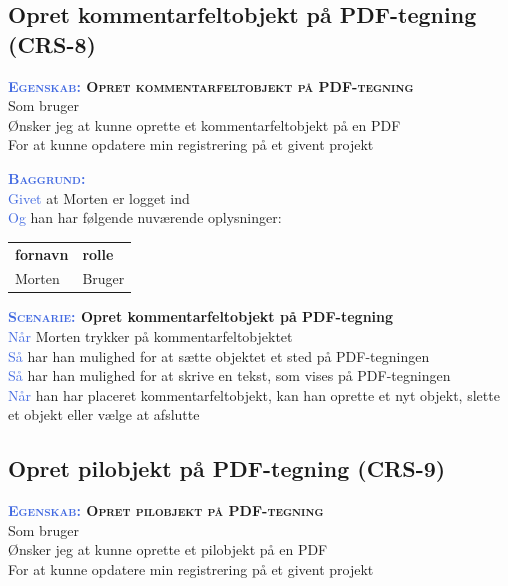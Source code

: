 \subsection{Opret kommentarfeltobjekt på PDF-tegning (CRS-8)} \label{sec:USOpretKommentarfelt}
\textbf{\textsc{\textcolor{RoyalBlue}{Egenskab:} Opret kommentarfeltobjekt på PDF-tegning}}\\
Som bruger\\
Ønsker jeg at kunne oprette et kommentarfeltobjekt på en PDF\\
For at kunne opdatere min registrering på et givent projekt \\

\clearpage

\textsc{\textcolor{RoyalBlue}{\textbf{Baggrund:}}}\\
\textcolor{RoyalBlue}{Givet} at Morten er logget ind\\
\textcolor{RoyalBlue}{Og} han har følgende nuværende oplysninger:\\
\begin{tabular}{| l | l |}
	\textbf{fornavn} & \textbf{rolle} \\
	Morten & Bruger\\
\end{tabular}

\textbf{\textsc{\textcolor{RoyalBlue}{Scenarie:}} Opret kommentarfeltobjekt på PDF-tegning}\\
\textcolor{RoyalBlue}{Når} Morten trykker på kommentarfeltobjektet\\
\textcolor{RoyalBlue}{Så}  har han mulighed for at sætte objektet et sted på PDF-tegningen\\
\textcolor{RoyalBlue}{Så}  har han mulighed for at skrive en tekst, som vises på PDF-tegningen\\
\textcolor{RoyalBlue}{Når} han har placeret kommentarfeltobjekt, kan han oprette et nyt objekt, slette et objekt eller vælge at afslutte \\

\subsection{Opret pilobjekt på PDF-tegning (CRS-9)} \label{sec:USOpretPilObjekt}
\textbf{\textsc{\textcolor{RoyalBlue}{Egenskab:} Opret pilobjekt på PDF-tegning}}\\
Som bruger\\
Ønsker jeg at kunne oprette et pilobjekt på en PDF\\
For at kunne opdatere min registrering på et givent projekt \\

